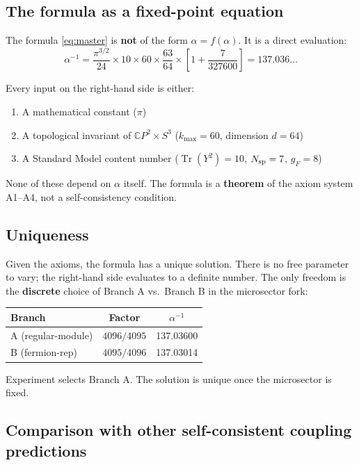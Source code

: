 \documentclass[12pt,a4paper]{article}
\newcommand{\Tr}{\operatorname{Tr}}
\newcommand{\CP}{\mathbb{C}P}
\begin{document}
\subsection{The formula as a fixed-point equation}

The formula \eqref{eq:master} is \textbf{not} of the form $\alpha = f(\alpha)$. It is a direct evaluation:
\begin{equation}
\alpha^{-1} = \frac{\pi^{3/2}}{24} \times 10 \times 60 \times \frac{63}{64} \times \left[1 + \frac{7}{327600}\right] = 137.036\ldots
\end{equation}

Every input on the right-hand side is either:
\begin{enumerate}
\item A mathematical constant ($\pi$)
\item A topological invariant of $\CP^2 \times S^3$ ($k_{\max} = 60$, dimension $d = 64$)
\item A Standard Model content number ($\Tr(Y^2) = 10$, $N_{\rm sp} = 7$, $g_F = 8$)
\end{enumerate}

None of these depend on $\alpha$ itself. The formula is a \textbf{theorem} of the axiom system A1--A4, not a self-consistency condition.

\subsection{Uniqueness}

Given the axioms, the formula has a unique solution. There is no free parameter to vary; the right-hand side evaluates to a definite number. The only freedom is the \textbf{discrete} choice of Branch A vs.\ Branch B in the microsector fork:
\begin{center}
\begin{tabular}{lcc}
\toprule
\textbf{Branch} & \textbf{Factor} & $\alpha^{-1}$ \\
\midrule
A (regular-module) & $4096/4095$ & 137.03600 \\
B (fermion-rep) & $4095/4096$ & 137.03014 \\
\bottomrule
\end{tabular}
\end{center}
Experiment selects Branch A. The solution is unique once the microsector is fixed.

\subsection{Comparison with other self-consistent coupling predictions}
\end{document}
